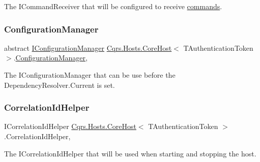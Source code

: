The I\+Command\+Receiver that will be configured to receive \hyperlink{}{commands}. 

\mbox{\label{classCqrs_1_1Hosts_1_1CoreHost_a768172344b47e2011878cf22466b18e3_a768172344b47e2011878cf22466b18e3}} 
\subsubsection{\texorpdfstring{Configuration\+Manager}{ConfigurationManager}}
{\footnotesize\ttfamily abstract \hyperlink{interfaceCqrs_1_1Configuration_1_1IConfigurationManager}{I\+Configuration\+Manager} \hyperlink{classCqrs_1_1Hosts_1_1CoreHost}{Cqrs.\+Hosts.\+Core\+Host}$<$ T\+Authentication\+Token $>$.\hyperlink{classCqrs_1_1Configuration_1_1ConfigurationManager}{Configuration\+Manager}\hspace{0.3cm}{\ttfamily [get]}, {\ttfamily [protected]}}



The I\+Configuration\+Manager that can be use before the Dependency\+Resolver.\+Current is set. 

\mbox{\label{classCqrs_1_1Hosts_1_1CoreHost_ac67d2efe8657b335feb997a0dd5aa6b0_ac67d2efe8657b335feb997a0dd5aa6b0}} 
\subsubsection{\texorpdfstring{Correlation\+Id\+Helper}{CorrelationIdHelper}}
{\footnotesize\ttfamily I\+Correlation\+Id\+Helper \hyperlink{classCqrs_1_1Hosts_1_1CoreHost}{Cqrs.\+Hosts.\+Core\+Host}$<$ T\+Authentication\+Token $>$.Correlation\+Id\+Helper\hspace{0.3cm}{\ttfamily [get]}, {\ttfamily [protected]}}



The I\+Correlation\+Id\+Helper that will be used when starting and stopping the host. 

